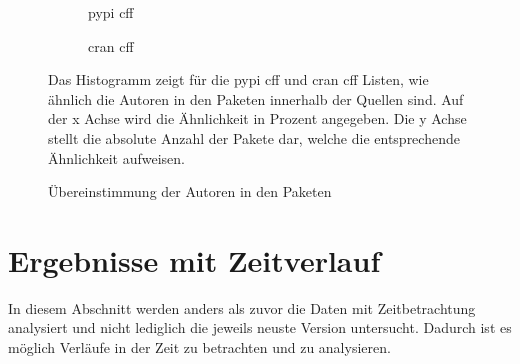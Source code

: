 \begin{figure}
    \begin{subfigure}{.5\textwidth}
        \centering
        
        \caption{\gls{pypi} \gls{cff}}
        \label{fig:similarity_pypi_cff}
    \end{subfigure}%
    \begin{subfigure}{.5\textwidth}
        \centering
        
        \caption{\gls{cran} \gls{cff}}
        \label{fig:similarity_cran_cff}
    \end{subfigure}
    \caption{Übereinstimmung der Autoren in den Paketen}
    \label{fig:similarities}
    \small
    \raggedright
    Das Histogramm zeigt für die \gls{pypi} \gls{cff} und \gls{cran} \gls{cff} Listen, wie ähnlich die Autoren in den Paketen innerhalb der Quellen sind. Auf der x Achse wird die Ähnlichkeit in Prozent angegeben. Die y Achse stellt die absolute Anzahl der Pakete dar, welche die entsprechende Ähnlichkeit aufweisen.
\end{figure}

\section{Ergebnisse mit Zeitverlauf}
\label{sec:gesamtheit_ergebnisse}
In diesem Abschnitt werden anders als zuvor die Daten mit Zeitbetrachtung analysiert und nicht lediglich die jeweils neuste Version untersucht.
Dadurch ist es möglich Verläufe in der Zeit zu betrachten und zu analysieren.


